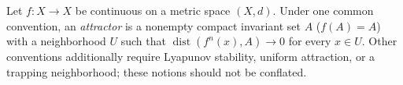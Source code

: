 
Let $f:X\to X$ be continuous on a metric space $(X,d)$. Under one common convention, an \emph{attractor} is a nonempty compact invariant set $A$ ($f(A)=A$) with a neighborhood $U$ such that $\operatorname{dist}(f^n(x),A)\to0$ for every $x\in U$. Other conventions additionally require Lyapunov stability, uniform attraction, or a trapping neighborhood; these notions should not be conflated.
